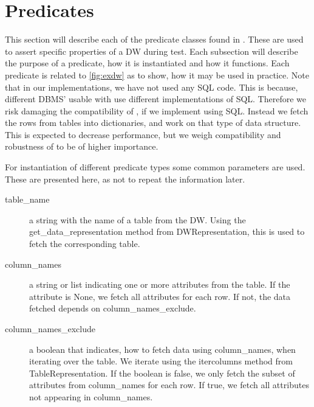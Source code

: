 \section{Predicates}\label{sect:pred}
This section will describe each of the predicate classes found in \FW. These are used to assert specific properties of a DW during test. Each subsection will describe the purpose of a predicate, how it is instantiated and how it functions. Each predicate is related to \cref{fig:exdw} as to show, how it may be used in practice. Note that in our implementations, we have not used any SQL code. This is because, different DBMS' usable with \FW{} use different implementations of SQL. Therefore we risk damaging the compatibility of \FW{}, if we implement using SQL. Instead we fetch the rows from tables into dictionaries, and work on that type of data structure. This is expected to decrease performance, but we weigh compatibility and robustness of \FW{} to be of higher importance.

For instantiation of different predicate types some common parameters are used. These are presented here, as not to repeat the information later.
\begin{description}
\item [table\_name] a string with the name of a table from the DW. Using the get\_data\_representation method from DWRepresentation, this is used to fetch the corresponding table.
\item [column\_names] a string or list indicating one or more attributes from the table. If the attribute is None, we fetch all attributes for each row. If not, the data fetched depends on column\_names\_exclude.
\item [column\_names\_exclude] a boolean that indicates, how to fetch data using column\_names, when iterating over the table. We iterate using the itercolumns method from TableRepresentation. If the boolean is false, we only fetch the subset of attributes from column\_names for each row. If true, we fetch all attributes not appearing in column\_names.
\end{description}












